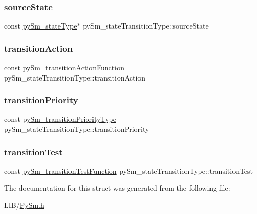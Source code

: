 \subsubsection{\texorpdfstring{source\+State}{sourceState}}
{\footnotesize\ttfamily const \hyperlink{structpySm__stateType}{py\+Sm\+\_\+state\+Type}$\ast$ py\+Sm\+\_\+state\+Transition\+Type\+::source\+State}

\mbox{\label{structpySm__stateTransitionType_a02fc12242851c7d129808a4e81cf1b78}} 
\subsubsection{\texorpdfstring{transition\+Action}{transitionAction}}
{\footnotesize\ttfamily const \hyperlink{PySm_8h_ac67ca0ce02947dc3f915629091327717}{py\+Sm\+\_\+transition\+Action\+Function} py\+Sm\+\_\+state\+Transition\+Type\+::transition\+Action}

\mbox{\label{structpySm__stateTransitionType_a0c95a5a437e65155d1100d3016f9575f}} 
\subsubsection{\texorpdfstring{transition\+Priority}{transitionPriority}}
{\footnotesize\ttfamily const \hyperlink{PySm_8h_ae3950be0321f85684919c1c5e0c3fba1}{py\+Sm\+\_\+transition\+Priority\+Type} py\+Sm\+\_\+state\+Transition\+Type\+::transition\+Priority}

\mbox{\label{structpySm__stateTransitionType_ab3a3cb53af27cfedcc63edb36d5f7639}} 
\subsubsection{\texorpdfstring{transition\+Test}{transitionTest}}
{\footnotesize\ttfamily const \hyperlink{PySm_8h_aeedbab67e9dba20efba287fbe3515e43}{py\+Sm\+\_\+transition\+Test\+Function} py\+Sm\+\_\+state\+Transition\+Type\+::transition\+Test}



The documentation for this struct was generated from the following file\+:\begin{DoxyCompactItemize}
\item 
L\+I\+B/\hyperlink{PySm_8h}{Py\+Sm.\+h}\end{DoxyCompactItemize}

